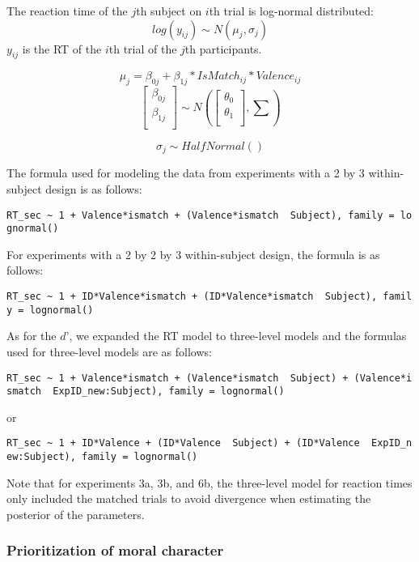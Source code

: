\documentclass[
  man]{apa6}
\begin{document}
The reaction time of the \(j\)th subject on \(i\)th trial is log-normal distributed:
\[ log(y_{ij}) \sim N(\mu_{j}, \sigma_{j})\]
\(y_{ij}\) is the RT of the \(i\)th trial of the \(j\)th participants.

\[\mu_{j} = \beta_{0j} + \beta_{1j}*IsMatch_{ij} * Valence_{ij}\]
\[ \begin{bmatrix}\beta_{0j}\\
\beta_{1j}\\
\end{bmatrix} \sim N(\begin{bmatrix}\theta_{0}\\
\theta_{1}\\
\end{bmatrix}, \sum) \]

\[\sigma_{j} \sim HalfNormal()\]

The formula used for modeling the data from experiments with a 2 by 3 within-subject design is as follows:

\texttt{RT\_sec\ \textasciitilde{}\ 1\ +\ Valence*ismatch\ +\ (Valence*ismatch\ \textbar{}\ Subject),\ family\ =\ lognormal()}

For experiments with a 2 by 2 by 3 within-subject design, the formula is as follows:

\texttt{RT\_sec\ \textasciitilde{}\ 1\ +\ ID*Valence*ismatch\ +\ (ID*Valence*ismatch\ \textbar{}\ Subject),\ family\ =\ lognormal()}

As for the \(d’\), we expanded the RT model to three-level models and the formulas used for three-level models are as follows:

\texttt{RT\_sec\ \textasciitilde{}\ 1\ +\ Valence*ismatch\ +\ (Valence*ismatch\ \textbar{}\ Subject)\ +\ (Valence*ismatch\ \textbar{}\ ExpID\_new:Subject),\ family\ =\ lognormal()}

or

\texttt{RT\_sec\ \textasciitilde{}\ 1\ +\ ID*Valence\ +\ (ID*Valence\ \textbar{}\ Subject)\ +\ (ID*Valence\ \textbar{}\ ExpID\_new:Subject),\ family\ =\ lognormal()}

Note that for experiments 3a, 3b, and 6b, the three-level model for reaction times only included the matched trials to avoid divergence when estimating the posterior of the parameters.

\hypertarget{prioritization-of-moral-character}{%
\subsubsection{Prioritization of moral character}\label{prioritization-of-moral-character}}
\end{document}
